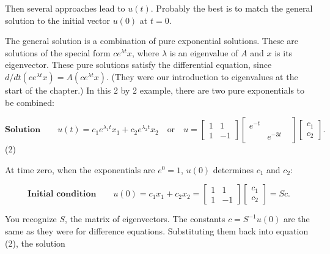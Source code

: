 Then several approaches lead to \(u(t)\). Probably the best is to match the general solution to the initial vector \(u(0)\) at \(t=0\).

The general solution is a combination of pure exponential solutions. These are solutions of the special form \(ce^{\lambda t}x\), where \(\lambda\) is an eigenvalue of \(A\) and \(x\) is its eigenvector. These pure solutions satisfy the differential equation, since \(d/dt(ce^{\lambda t}x)=A(ce^{\lambda t}x)\). (They were our introduction to eigenvalues at the start of the chapter.) In this 2 by 2 example, there are two pure exponentials to be combined:

\[\textbf{Solution}\qquad u(t)=c_{1}e^{\lambda_{1}t}x_{1}+c_{2}e^{\lambda_{2}t}x _{2}\quad\text{or}\quad u=\begin{bmatrix}1&1\\ 1&-1\end{bmatrix}\begin{bmatrix}e^{-t}&&\\ &e^{-3t}\end{bmatrix}\begin{bmatrix}c_{1}\\ c_{2}\end{bmatrix}.\] (2)

At time zero, when the exponentials are \(e^{0}=1\), \(u(0)\) determines \(c_{1}\) and \(c_{2}\):

\[\textbf{Initial condition}\qquad u(0)=c_{1}x_{1}+c_{2}x_{2}=\begin{bmatrix}1&1 \\ 1&-1\end{bmatrix}\begin{bmatrix}c_{1}\\ c_{2}\end{bmatrix}=Sc.\]

You recognize \(S\), the matrix of eigenvectors. The constants \(c=S^{-1}u(0)\) are the same as they were for difference equations. Substituting them back into equation (2), the solution